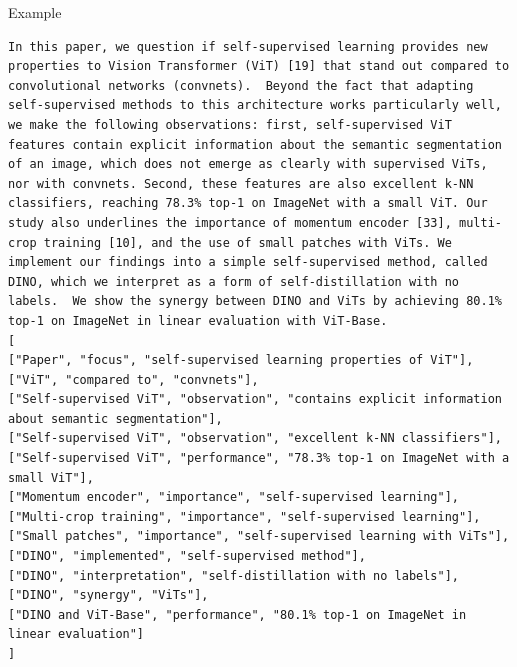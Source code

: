 \documentclass[aspectratio=1610,xcolor={dvipsnames},hyperref={colorlinks,unicode,linkcolor=violet,anchorcolor=BlueViolet,citecolor=YellowOrange,filecolor=black,urlcolor=Aquamarine}]{beamer}
\begin{document}
\begin{frame}{Example}
\begin{verbatim}
In this paper, we question if self-supervised learning provides new properties to Vision Transformer (ViT) [19] that stand out compared to convolutional networks (convnets).  Beyond the fact that adapting self-supervised methods to this architecture works particularly well, we make the following observations: first, self-supervised ViT features contain explicit information about the semantic segmentation of an image, which does not emerge as clearly with supervised ViTs, nor with convnets. Second, these features are also excellent k-NN classifiers, reaching 78.3% top-1 on ImageNet with a small ViT. Our study also underlines the importance of momentum encoder [33], multi-crop training [10], and the use of small patches with ViTs. We implement our findings into a simple self-supervised method, called DINO, which we interpret as a form of self-distillation with no labels.  We show the synergy between DINO and ViTs by achieving 80.1% top-1 on ImageNet in linear evaluation with ViT-Base.
[
["Paper", "focus", "self-supervised learning properties of ViT"],
["ViT", "compared to", "convnets"],
["Self-supervised ViT", "observation", "contains explicit information about semantic segmentation"],
["Self-supervised ViT", "observation", "excellent k-NN classifiers"],
["Self-supervised ViT", "performance", "78.3% top-1 on ImageNet with a small ViT"],
["Momentum encoder", "importance", "self-supervised learning"],
["Multi-crop training", "importance", "self-supervised learning"],
["Small patches", "importance", "self-supervised learning with ViTs"],
["DINO", "implemented", "self-supervised method"],
["DINO", "interpretation", "self-distillation with no labels"],
["DINO", "synergy", "ViTs"],
["DINO and ViT-Base", "performance", "80.1% top-1 on ImageNet in linear evaluation"]
]


\end{verbatim}
\end{frame}
\end{document}
